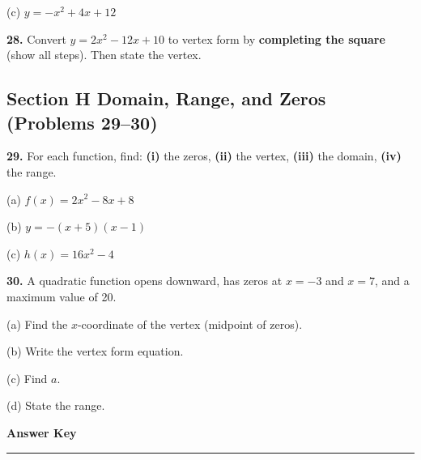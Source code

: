 \documentclass[11pt]{article}
\newcommand{\ws}[1][3cm]{\vspace{#1}}
\begin{document}
\hspace{1cm}(c) $y = -x^2 + 4x + 12$

\ws[3cm]

\textbf{28.} Convert $y = 2x^2 - 12x + 10$ to vertex form by
\textbf{completing the square} (show all steps).
Then state the vertex.

\ws[4cm]

\subsection*{Section H \quad Domain, Range, and Zeros (Problems 29--30)}

\textbf{29.} For each function, find: \textbf{(i)} the zeros, \textbf{(ii)} the vertex,
\textbf{(iii)} the domain, \textbf{(iv)} the range.

\hspace{1cm}(a) $f(x) = 2x^2 - 8x + 8$

\ws[4cm]

\hspace{1cm}(b) $y = -(x + 5)(x - 1)$

\ws[4cm]

\hspace{1cm}(c) $h(x) = 16x^2 - 4$

\ws[4cm]

\textbf{30.} A quadratic function opens downward, has zeros at $x = -3$ and $x = 7$,
and a maximum value of 20.

\hspace{1cm}(a) Find the $x$-coordinate of the vertex (midpoint of zeros).

\hspace{1cm}(b) Write the vertex form equation.

\hspace{1cm}(c) Find $a$.

\hspace{1cm}(d) State the range.

\ws[4cm]

\newpage
\begin{center}
  {\Large\textbf{Answer Key}}
\end{center}
\hrule
\vspace{0.4cm}
\end{document}
